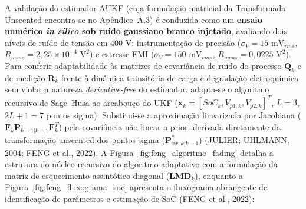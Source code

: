 A validação do estimador AUKF (cuja formulação matricial da Transformada Unscented encontra-se no Apêndice~A.3) é conduzida como um \textbf{ensaio numérico \textit{in silico} sob ruído gaussiano branco injetado}, avaliando dois níveis de ruído de tensão em $400\text{ V}$: instrumentação de precisão ($\sigma_V = 15\text{ mV}_{rms}$, $R_{meas} = 2{,}25 \times 10^{-4}\text{ V}^2$) e estresse EMI ($\sigma_V = 150\text{ mV}_{rms}$, $R_{meas} = 0{,}0225\text{ V}^2$). Para conferir adaptabilidade às matrizes de covariância de ruído do processo $\mathbf{Q}_k$ e de medição $\mathbf{R}_k$ frente à dinâmica transitória de carga e degradação eletroquímica sem violar a natureza \textit{derivative-free} do estimador, adapta-se o algoritmo recursivo de Sage--Husa ao arcabouço do UKF ($\mathbf{x}_k = [SoC_k, V_{p1,k}, V_{p2,k}]^T$, $L = 3$, $2L+1=7$ pontos sigma). Substitui-se a aproximação linearizada por Jacobiana ($\mathbf{F}_k \mathbf{P}_{k-1|k-1} \mathbf{F}_k^T$) pela covariância não linear a priori derivada diretamente da transformação unscented dos pontos sigma ($\mathbf{P}_{xx, k|k-1}^*$) (JULIER; UHLMANN, 2004; FENG et al., 2022). A Figura~\ref{fig:feng_algoritmo_fading} detalha a estrutura do núcleo recursivo do algoritmo adaptativo com a formulação da matriz de esquecimento assintótico diagonal ($\mathbf{LMD}_k$), enquanto a Figura~\ref{fig:feng_fluxograma_soc} apresenta o fluxograma abrangente de identificação de parâmetros e estimação de SoC (FENG et al., 2022):


